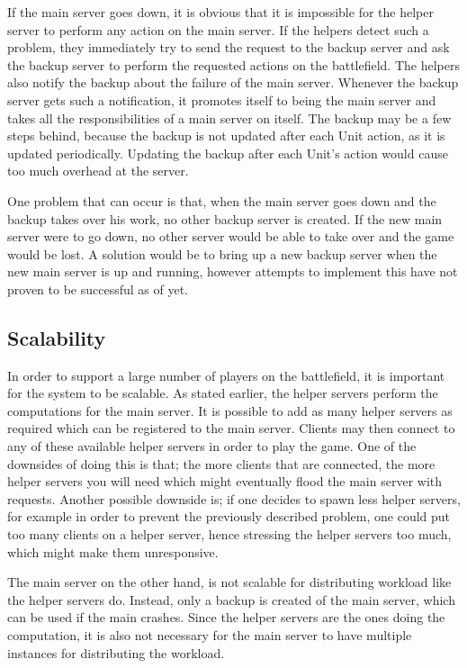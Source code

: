 If the main server goes down, it is obvious that it is impossible for the helper server to perform any action on the main server.
If the helpers detect such a problem, they immediately try to send the request to the backup server and ask the backup server to perform the requested actions on the battlefield.
The helpers also notify the backup about the failure of the main server.
Whenever the backup server gets such a notification, it promotes itself to being the main server and takes all the responsibilities of a main server on itself.
The backup may be a few steps behind, because the backup is not updated after each Unit action, as it is updated periodically. 
Updating the backup after each Unit's action would cause too much overhead at the server. 

One problem that can occur is that, when the main server goes down and the backup takes over his work, no other backup server is created. 
If the new main server were to go down, no other server would be able to take over and the game would be lost. 
A solution would be to bring up a new backup server when the new main server is up and running, however attempts to implement this have not proven to be successful as of yet.

\subsection{Scalability}
In order to support a large number of players on the battlefield, it is important for the system to be scalable.
As stated earlier, the helper servers perform the computations for the main server.
It is possible to add as many helper servers as required which can be registered to the main server.
Clients may then connect to any of these available helper servers in order to play the game. 
One of the downsides of doing this is that; the more clients that are connected, the more helper servers you will need which might eventually flood the main server with requests. 
Another possible downside is; if one decides to spawn less helper servers, for example in order to prevent the previously described problem, one could put too many clients on a helper server, hence stressing the helper servers too much, which might make them unresponsive.

The main server on the other hand, is not scalable for distributing workload like the helper servers do. 
Instead, only a backup is created of the main server, which can be used if the main crashes.
Since the helper servers are the ones doing the computation, it is also not necessary for the main server to have multiple instances for distributing the workload.
 
